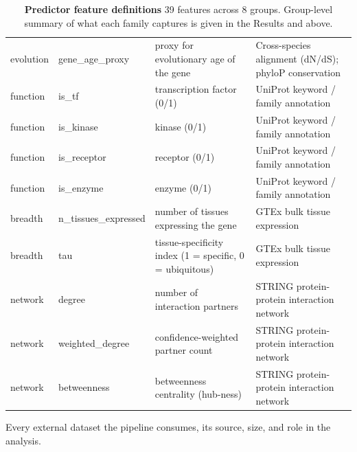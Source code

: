 \documentclass[times, twoside]{zHenriquesLab-StyleBioRxiv}
\begin{document}
\begin{table}[tbp]
{\begin{tabular}{@{}p{}p{}p{}p{}@{}}
evolution & gene\_age\_proxy & proxy for evolutionary age of the gene & Cross-species alignment (dN/dS); phyloP conservation \\
function & is\_tf & transcription factor (0/1) & UniProt keyword / family annotation \\
function & is\_kinase & kinase (0/1) & UniProt keyword / family annotation \\
function & is\_receptor & receptor (0/1) & UniProt keyword / family annotation \\
function & is\_enzyme & enzyme (0/1) & UniProt keyword / family annotation \\
breadth & n\_tissues\_expressed & number of tissues expressing the gene & GTEx bulk tissue expression \\
breadth & tau & tissue-specificity index (1 = specific, 0 = ubiquitous) & GTEx bulk tissue expression \\
network & degree & number of interaction partners & STRING protein-protein interaction network \\
network & weighted\_degree & confidence-weighted partner count & STRING protein-protein interaction network \\
network & betweenness & betweenness centrality (hub-ness) & STRING protein-protein interaction network \\
\bottomrule
\end{tabular}
}
\caption{\textbf{Predictor feature definitions} 39 features across 8 groups. Group-level summary of what each family captures is given in the Results and above.}
\label{tab:features}
\end{table}
Every external dataset the pipeline consumes, its source, size, and role in the analysis.
\end{document}
